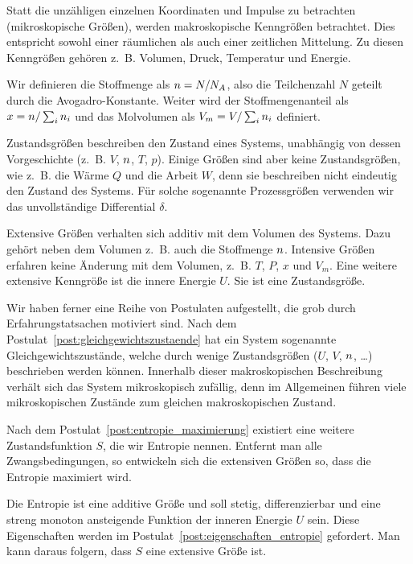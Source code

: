 \begin{summary}
    Statt die unzähligen einzelnen Koordinaten und Impulse zu betrachten (mikroskopische Größen), werden makroskopische Kenngrößen betrachtet. Dies entspricht sowohl einer räumlichen als auch einer zeitlichen Mittelung. Zu diesen Kenngrößen gehören z.~B. Volumen, Druck, Temperatur und Energie. 

    Wir definieren die Stoffmenge als $n = N/N_A$, also die Teilchenzahl $N$ geteilt durch die Avogadro-Konstante. Weiter wird der Stoffmengenanteil als $x=n/\sum_i n_i$ und das Molvolumen als $V_m = V/\sum_i n_i$ definiert. 

    Zustandsgrößen beschreiben den Zustand eines Systems, unabhängig von dessen Vorgeschichte (z.~B. $V$, $n$, $T$, $p$). 
    Einige Größen sind aber keine Zustandsgrößen, wie z.~B. die Wärme $Q$ und die Arbeit $W$, denn sie beschreiben nicht eindeutig den Zustand des Systems. Für solche sogenannte Prozessgrößen verwenden wir das unvollständige Differential $\delta$. 

    Extensive Größen verhalten sich additiv mit dem Volumen des Systems. Dazu gehört neben dem Volumen z.~B. auch die Stoffmenge $n$. 
    Intensive Größen erfahren keine Änderung mit dem Volumen, z.~B. $T$, $P$, $x$ und $V_m$.
    Eine weitere extensive Kenngröße ist die innere Energie $U$. Sie ist eine Zustandsgröße. 

    Wir haben ferner eine Reihe von Postulaten aufgestellt, die grob durch Erfahrungstatsachen motiviert sind. Nach dem Postulat~\ref{post:gleichgewichtszustaende} hat ein System sogenannte Gleichgewichtszustände, welche durch wenige Zustandsgrößen ($U$, $V$, $n$, \ldots) beschrieben werden können. 
    Innerhalb dieser makroskopischen Beschreibung verhält sich das System mikroskopisch zufällig, denn im Allgemeinen führen viele mikroskopischen Zustände zum gleichen makroskopischen Zustand. 

    Nach dem Postulat~\ref{post:entropie_maximierung} existiert eine weitere Zustandsfunktion $S$, die wir Entropie nennen. Entfernt man alle Zwangsbedingungen, so  entwickeln sich die extensiven Größen so, dass die Entropie maximiert wird. 

    Die Entropie ist eine additive Größe und soll stetig, differenzierbar und eine streng monoton ansteigende Funktion der inneren Energie $U$ sein. Diese Eigenschaften werden im Postulat~\ref{post:eigenschaften_entropie} gefordert. Man kann daraus folgern, dass $S$ eine extensive Größe ist. 


\end{summary}
